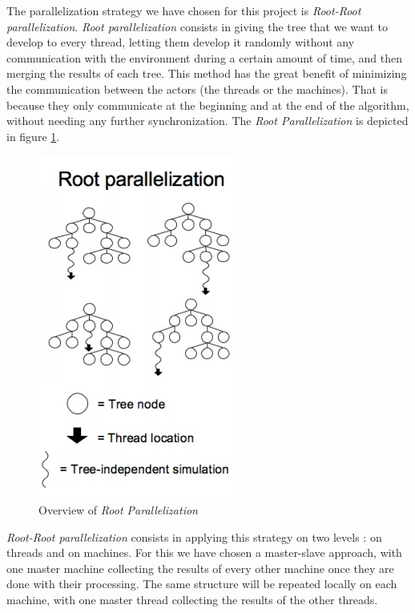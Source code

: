 The parallelization strategy we have chosen for this project is \emph{Root-Root parallelization}.
\emph{Root parallelization} consists in giving the tree that we want to develop to every thread, letting them develop it randomly without any communication with the environment during a certain amount of time, and then merging the results of each tree.
This method has the great benefit of minimizing the communication between the actors (the threads or the machines).
That is because they only communicate at the beginning and at the end of the algorithm, without needing any further synchronization.
The \textit{Root Parallelization} is depicted in figure \ref{fig:root}.

\begin{figure}[!ht] 
\centerline{\includegraphics[scale=0.5]{Parallelisation/Strategy/Img/root.png}}
   \caption{Overview of \emph{Root Parallelization} \cite{parallel_comp}}
\label{fig:root}
\end{figure}

\emph{Root-Root parallelization} consists in applying this strategy on two levels : on threads and on machines.
For this we have chosen a master-slave approach, with one master machine collecting the results of every other machine once they are done with their processing.
The same structure will be repeated locally on each machine, with one master thread collecting the results of the other threads.
